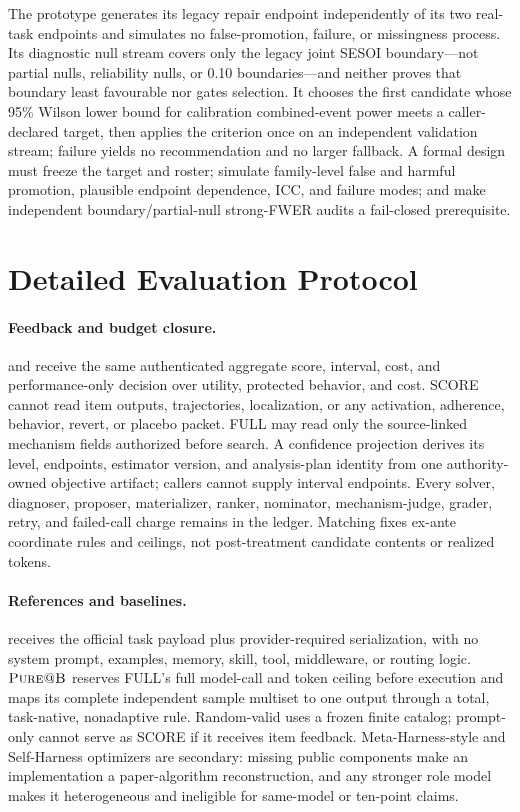 The prototype generates its legacy repair endpoint independently of its two
real-task endpoints and simulates no false-promotion, failure, or missingness
process.  Its diagnostic null stream covers only the legacy joint SESOI
boundary---not partial nulls, reliability nulls, or 0.10 boundaries---and
neither proves that boundary least favourable nor gates selection.  It chooses the first
candidate whose 95\% Wilson lower bound for calibration combined-event power
meets a caller-declared target, then applies the criterion once on an independent
validation stream; failure yields no recommendation and no larger fallback.  A
formal design must freeze the target and roster; simulate family-level false and
harmful promotion, plausible endpoint dependence, ICC, and failure modes; and
make independent boundary/partial-null strong-FWER audits a fail-closed
prerequisite.

\section{Detailed Evaluation Protocol}
\label{app:evaluation-details}

\paragraph{Feedback and budget closure.}
\scorearm{} and \fullarm{} receive the same authenticated aggregate score,
interval, cost, and performance-only decision over utility, protected behavior,
and cost.  SCORE cannot read item outputs, trajectories, localization, or any
activation, adherence, behavior, revert, or placebo packet.  FULL may read only
the source-linked mechanism fields authorized before search.  A confidence
projection derives its level, endpoints, estimator version, and analysis-plan
identity from one authority-owned objective artifact; callers cannot supply
interval endpoints.  Every solver, diagnoser, proposer, materializer, ranker,
nominator, mechanism-judge, grader, retry, and failed-call charge remains in
the ledger.  Matching fixes ex-ante coordinate
rules and ceilings, not post-treatment candidate contents or realized tokens.

\paragraph{References and baselines.}
\purearm{} receives the official task payload plus provider-required
serialization, with no system prompt, examples, memory, skill, tool,
middleware, or routing logic.  \(\textsc{Pure@B}\) reserves FULL's full
model-call and token ceiling before execution and maps its complete independent
sample multiset to one output through a total, task-native, nonadaptive rule.
Random-valid uses a frozen finite catalog; prompt-only cannot serve as SCORE if
it receives item feedback.  Meta-Harness-style and Self-Harness optimizers are
secondary: missing public components make an implementation a paper-algorithm
reconstruction, and any stronger role model makes it heterogeneous and
ineligible for same-model or ten-point claims.

